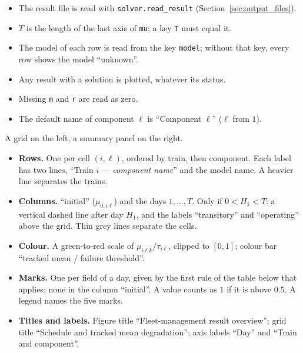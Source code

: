 \begin{itemize}[nosep]
  \item The result file is read with \texttt{solver.read\_result} (Section~\ref{sec:output_files}).
  \item $T$ is the length of the last axis of \texttt{mu}; a key \texttt{T} must equal it.
  \item The model of each row is read from the key \texttt{model}; without that key, every row shows the model ``unknown''.
  \item Any result with a solution is plotted, whatever its status.
  \item Missing \texttt{m} and \texttt{r} are read as zero.
  \item The default name of component $\ell$ is ``Component $\ell$'' ($\ell$ from $1$).
\end{itemize}

\tabend

A grid on the left, a summary panel on the right.
\begin{itemize}[nosep]
  \item \textbf{Rows.} One per cell $(i,\ell)$, ordered by train, then component. Each label has two lines, ``Train $i$ --- \emph{component name}'' and the model name. A heavier line separates the trains.
  \item \textbf{Columns.} ``initial'' ($\mu_{0,i\ell}$) and the days $1,\ldots,T$. Only if $0 < H_1 < T$: a vertical dashed line after day $H_1$, and the labels ``transitory'' and ``operating'' above the grid. Thin grey lines separate the cells.
  \item \textbf{Colour.} A green-to-red scale of $\mu_{i\ell k}/\tau_{i\ell}$, clipped to $[0,1]$; colour bar ``tracked mean / failure threshold''.
  \item \textbf{Marks.} One per field of a day, given by the first rule of the table below that applies; none in the column ``initial''. A value counts as $1$ if it is above $0.5$. A legend names the five marks.
  \item \textbf{Titles and labels.} Figure title ``Fleet-management result overview''; grid title ``Schedule and tracked mean degradation''; axis labels ``Day'' and ``Train and component''.
\end{itemize}

